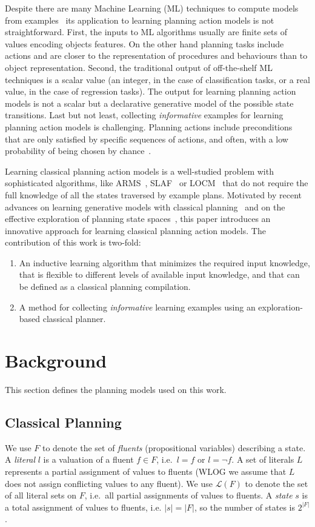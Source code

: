 \documentclass[letterpaper]{article} %
\begin{document}
Despite there are many Machine Learning (ML) techniques to compute models from examples~\cite{michalski2013machine} its application to learning planning action models is not straightforward. First, the inputs to ML algorithms usually are finite sets of values encoding objects features. On the other hand planning tasks include actions and are closer to the representation of procedures and behaviours than to object representation. Second, the traditional output of off-the-shelf ML techniques is a scalar value (an integer, in the case of classification tasks, or a real value, in the case of regression tasks). The output for learning planning action models is not a scalar but a declarative generative model of the possible state transitions. Last but not least, collecting {\em informative} examples for learning planning action models is challenging. Planning actions include preconditions that are only satisfied by specific sequences of actions, and often, with a low probability of being chosen by chance~\cite{fern2004learning}.

Learning classical planning action models is a well-studied problem with sophisticated algorithms, like ARMS~\cite{yang2007learning}, SLAF~\cite{amir:alearning:JAIR08} or LOCM~\cite{cresswell2013acquiring} that do not require the full knowledge of all the states traversed by example plans. Motivated by recent advances on learning generative models with classical planning~\cite{segovia2017generating} and on the effective exploration of planning state spaces~\cite{geffner:novelty:IJCAI17}, this paper introduces an innovative approach for learning classical planning action models. The contribution of this work is two-fold:
\begin{enumerate}
\item An inductive learning algorithm that minimizes the required input knowledge, that is flexible to different levels of available input knowledge, and that can be defined as a classical planning compilation. 
\item A method for collecting {\em informative} learning examples using an exploration-based classical planner.
\end{enumerate}


\section{Background}
This section defines the planning models used on this work.

\subsection{Classical Planning}
We use $F$ to denote the set of {\em fluents} (propositional variables) describing a state. A {\em literal} $l$ is a valuation of a fluent $f\in F$, i.e.~$l=f$ or $l=\neg f$. A set of literals $L$ represents a partial assignment of values to fluents (WLOG we assume that $L$ does not assign conflicting values to any fluent). We use $\mathcal{L}(F)$ to denote the set of all literal sets on $F$, i.e.~all partial assignments of values to fluents. A {\em state} $s$ is a total assignment of values to fluents, i.e. $|s|=|F|$, so the number of states is $2^{|F|}$. 
\end{document}
